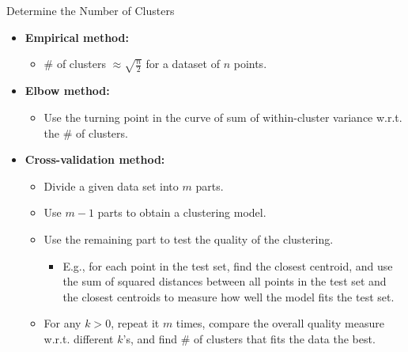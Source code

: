 \begin{frame}{Determine the Number of Clusters}
	\begin{itemize}
		\item \textbf{Empirical method:}
		      \begin{itemize}
			      \item $\#$ of clusters $\approx \sqrt{\frac{n}{2}}$ for a dataset
			            of $n$ points.
		      \end{itemize}
		\item \textbf{Elbow method:}
		      \begin{itemize}
			      \item Use the turning point in the curve of sum of within-cluster
			            variance w.r.t. the $\#$ of clusters.
		      \end{itemize}
		\item \textbf{Cross-validation method:}
		      \begin{itemize}
			      \item Divide a given data set into $m$ parts.
			      \item Use $m-1$ parts to obtain a clustering model.
			      \item Use the remaining part to test the quality of the clustering.
			            \begin{itemize}
				            \item E.g., for each point in the test set, find the closest
				                  centroid, and use the sum of squared distances between all
				                  points in the test set and the closest centroids to measure how
				                  well the model fits the test set.
			            \end{itemize}
			      \item For any $k > 0$, repeat it $m$ times, compare the overall
			            quality measure w.r.t. different $k$'s, and find $\#$ of clusters
			            that fits the data the best.
		      \end{itemize}
	\end{itemize}
\end{frame}

